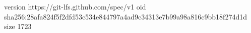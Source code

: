 version https://git-lfs.github.com/spec/v1
oid sha256:28afa824f5f2dfd53c534e844797a4ad9c34313e7b99a98a816c9bb18f274d1d
size 1723
